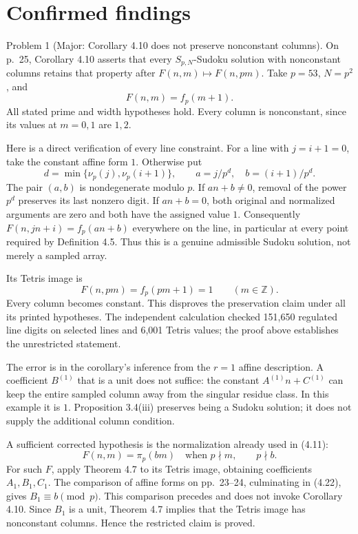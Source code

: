 \documentclass[10pt]{article}
\begin{document}
\section*{Confirmed findings}
Problem 1 (Major: Corollary 4.10 does not preserve nonconstant columns).  On p. 25, Corollary 4.10 asserts that every \(S_{p,N}\)-Sudoku solution with nonconstant columns retains that property after \(F(n,m)\mapsto F(n,pm)\). Take \(p=53\), \(N=p^2\), and \[F(n,m)=f_p(m+1).\] All stated prime and width hypotheses hold. Every column is nonconstant, since its values at \(m=0,1\) are \(1,2\).\par
Here is a direct verification of every line constraint. For a line with \(j=i+1=0\), take the constant affine form \(1\). Otherwise put \[d=\min\{\nu_p(j),\nu_p(i+1)\},\qquad
 a=j/p^d,\quad b=(i+1)/p^d.\] The pair \((a,b)\) is nondegenerate modulo \(p\). If \(an+b\ne0\), removal of the power \(p^d\) preserves its last nonzero digit. If \(an+b=0\), both original and normalized arguments are zero and both have the assigned value \(1\). Consequently \(F(n,jn+i)=f_p(an+b)\) everywhere on the line, in particular at every point required by Definition 4.5. Thus this is a genuine admissible Sudoku solution, not merely a sampled array.\par
Its Tetris image is \[F(n,pm)=f_p(pm+1)=1
                         \qquad(m\in\mathbb Z).\] Every column becomes constant. This disproves the preservation claim under all its printed hypotheses. The independent calculation checked 151,650 regulated line digits on selected lines and 6,001 Tetris values; the proof above establishes the unrestricted statement.\par
The error is in the corollary’s inference from the \(r=1\) affine description. A coefficient \(B^{(1)}\) that is a unit does not suffice: the constant \(A^{(1)}n+C^{(1)}\) can keep the entire sampled column away from the singular residue class. In this example it is \(1\). Proposition 3.4(iii) preserves being a Sudoku solution; it does not supply the additional column condition.\par
A sufficient corrected hypothesis is the normalization already used in (4.11): \[F(n,m)=\pi_p(bm)\quad\text{when }p\nmid m,\qquad p\nmid b.\] For such \(F\), apply Theorem 4.7 to its Tetris image, obtaining coefficients \(A_1,B_1,C_1\). The comparison of affine forms on pp. 23–24, culminating in (4.22), gives \(B_1\equiv b\pmod p\). This comparison precedes and does not invoke Corollary 4.10. Since \(B_1\) is a unit, Theorem 4.7 implies that the Tetris image has nonconstant columns. Hence the restricted claim is proved.\par
\end{document}

